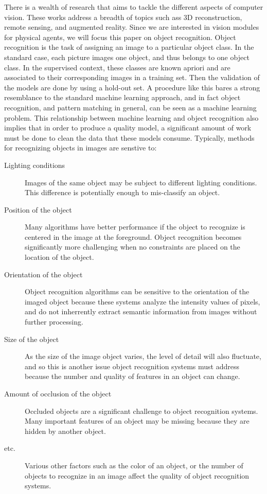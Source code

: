 \documentclass[conference]{IEEEtran}
\begin{document}
There is a wealth of research that aims to tackle the different aspects of computer vision. These works address a breadth of topics such ass 3D reconstruction, remote sensing, and augmented reality. Since we are interested in vision modules for physical agents, we will focus this paper on object recognition. Object recognition is the task of assigning an image to a particular object class. In the standard case, each picture images one object, and thus belongs to one object class. In the supervised context, these classes are known apriori and are associated to their corresponding images in a training set. Then the validation of the models are done by using a hold-out set. A procedure like this bares a strong resemblance to the standard machine learning approach, and in fact object recognition, and pattern matching in general, can be seen as a machine learning problem. This relationship between machine learning and object recognition also implies that in order to produce a quality model, a significant amount of work must be done to clean the data that these models consume. Typically, methods for recognizing objects in images are senstive to:
\begin{description}
\item [Lighting conditions]
  Images of the same object may be subject to different lighting conditions. This difference is potentially enough to mis-classify an object.
\item [Position of the object]
  Many algorithms have better performance if the object to recognize is centered in the image at the foreground. Object recognition becomes significantly more challenging when no constraints are placed on the location of the object.
\item [Orientation of the object]
  Object recognition algorithms can be sensitive to the orientation of the imaged object because these systems analyze the intensity values of pixels, and do not inherrently extract semantic information from images without further processing.
\item [Size of the object]
  As the size of the image object varies, the level of detail will also fluctuate, and so this is another issue object recognition systems must address because the number and quality of features in an object can change.
\item [Amount of occlusion of the object]
  Occluded objects are a significant challenge to object recognition systems. Many important features of an object may be missing because they are hidden by another object. 
\item [etc.]
  Various other factors such as the color of an object, or the number of objects to recognize in an image affect the quality of object recognition systems.
\end{description}
\end{document}
